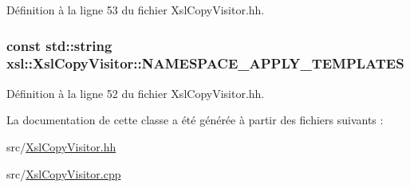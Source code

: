 Définition à la ligne 53 du fichier XslCopyVisitor.hh.

\hypertarget{classxsl_1_1_xsl_copy_visitor_a9b0a28eb3efa498aeb497f258ddc6de4}{
\subsubsection[{NAMESPACE\_\-APPLY\_\-TEMPLATES}]{\setlength{\rightskip}{0pt plus 5cm}const std::string {\bf xsl::XslCopyVisitor::NAMESPACE\_\-APPLY\_\-TEMPLATES}}}
\label{classxsl_1_1_xsl_copy_visitor_a9b0a28eb3efa498aeb497f258ddc6de4}


Définition à la ligne 52 du fichier XslCopyVisitor.hh.



La documentation de cette classe a été générée à partir des fichiers suivants :\begin{DoxyCompactItemize}
\item 
src/\hyperlink{_xsl_copy_visitor_8hh}{XslCopyVisitor.hh}\item 
src/\hyperlink{_xsl_copy_visitor_8cpp}{XslCopyVisitor.cpp}\end{DoxyCompactItemize}
